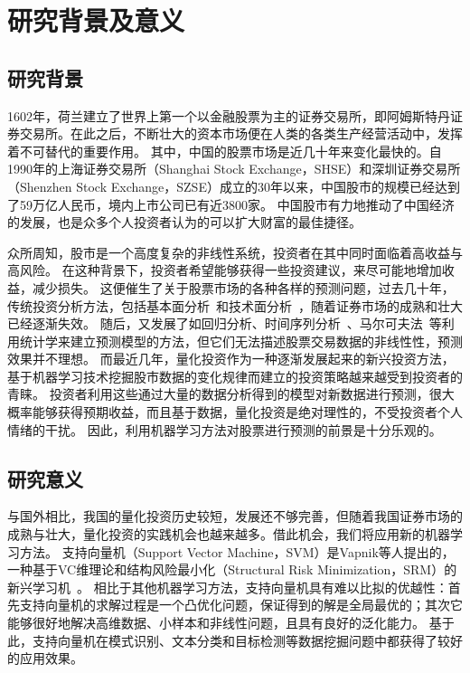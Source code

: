 \documentclass[a4paper,12pt]{Proposal}
\begin{document}
\author{郭富士~~~~~~~~~~091603430}

\maketitle
\section{研究背景及意义}
\subsection{研究背景}
1602年，荷兰建立了世界上第一个以金融股票为主的证券交易所，即阿姆斯特丹证券交易所。在此之后，不断壮大的资本市场便在人类的各类生产经营活动中，发挥着不可替代的重要作用。
其中，中国的股票市场是近几十年来变化最快的。自1990年的上海证券交易所（Shanghai Stock Exchange，SHSE）和深圳证券交易所（Shenzhen Stock Exchange，SZSE）成立的30年以来，中国股市的规模已经达到了59万亿人民币，境内上市公司已有近3800家。
中国股市有力地推动了中国经济的发展，也是众多个人投资者认为的可以扩大财富的最佳捷径。

众所周知，股市是一个高度复杂的非线性系统，投资者在其中同时面临着高收益与高风险。
在这种背景下，投资者希望能够获得一些投资建议，来尽可能地增加收益，减少损失。
这便催生了关于股票市场的各种各样的预测问题，过去几十年，传统投资分析方法，包括基本面分析~\citep{cn1}和技术面分析~\citep{cn2}，随着证券市场的成熟和壮大已经逐渐失效。
随后，又发展了如回归分析、时间序列分析~\citep{cn3}、马尔可夫法~\citep{cn4}等利用统计学来建立预测模型的方法，但它们无法描述股票交易数据的非线性性，预测效果并不理想。
而最近几年，量化投资作为一种逐渐发展起来的新兴投资方法，基于机器学习技术挖掘股市数据的变化规律而建立的投资策略越来越受到投资者的青睐。
投资者利用这些通过大量的数据分析得到的模型对新数据进行预测，很大概率能够获得预期收益，而且基于数据，量化投资是绝对理性的，不受投资者个人情绪的干扰。
因此，利用机器学习方法对股票进行预测的前景是十分乐观的。
\subsection{研究意义}
与国外相比，我国的量化投资历史较短，发展还不够完善，但随着我国证券市场的成熟与壮大，量化投资的实践机会也越来越多。借此机会，我们将应用新的机器学习方法。
支持向量机（Support Vector Machine，SVM）是Vapnik等人提出的，一种基于VC维理论和结构风险最小化（Structural Risk Minimization，SRM）的新兴学习机~\citep{en1}。
相比于其他机器学习方法，支持向量机具有难以比拟的优越性：首先支持向量机的求解过程是一个凸优化问题，保证得到的解是全局最优的；其次它能够很好地解决高维数据、小样本和非线性问题，且具有良好的泛化能力。
基于此，支持向量机在模式识别、文本分类和目标检测等数据挖掘问题中都获得了较好的应用效果。
\end{document}
